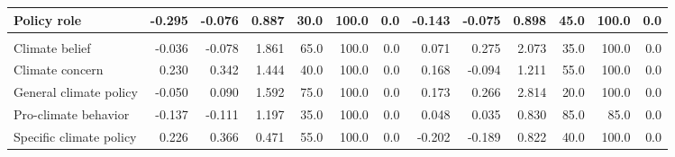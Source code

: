 \documentclass[
  letterpaper,
  DIV=11,
  numbers=noendperiod]{scrartcl}
\begin{document}
\begin{table}
{\begin{tabular*}{\linewidth}{@{\extracolsep{\fill}}lrrrrrrrrrrrr}
Policy role & -0.295 & -0.076 & 0.887 & 30.0 & 100.0 & 0.0 & -0.143 & -0.075 & 0.898 & 45.0 & 100.0 & 0.0 \\ 
\midrule\addlinespace[2.5pt]
\multicolumn{13}{l}{{\bfseries Tertiary}} \\[2.5pt] 
\midrule\addlinespace[2.5pt]
Climate belief & -0.036 & -0.078 & 1.861 & 65.0 & 100.0 & 0.0 & 0.071 & 0.275 & 2.073 & 35.0 & 100.0 & 0.0 \\ 
Climate concern & 0.230 & 0.342 & 1.444 & 40.0 & 100.0 & 0.0 & 0.168 & -0.094 & 1.211 & 55.0 & 100.0 & 0.0 \\ 
General climate policy & -0.050 & 0.090 & 1.592 & 75.0 & 100.0 & 0.0 & 0.173 & 0.266 & 2.814 & 20.0 & 100.0 & 0.0 \\ 
Pro-climate behavior & -0.137 & -0.111 & 1.197 & 35.0 & 100.0 & 0.0 & 0.048 & 0.035 & 0.830 & 85.0 & 85.0 & 0.0 \\ 
Specific climate policy & 0.226 & 0.366 & 0.471 & 55.0 & 100.0 & 0.0 & -0.202 & -0.189 & 0.822 & 40.0 & 100.0 & 0.0 \\ 
\bottomrule
\end{tabular*}

}

\end{table}%
\end{document}
